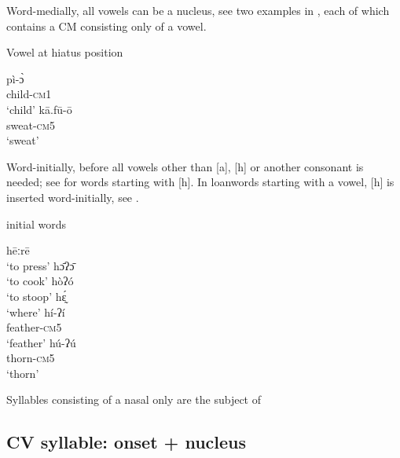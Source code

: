 \documentclass[output=paper]{langscibook}
\begin{document}
Word-medially, all vowels can be a nucleus, see two examples in , each of which contains a CM consisting only of a vowel.

 \begin{exe}
     \ex \label{ex:traore:VowelHiatusPosition:6}Vowel at hiatus position
     \begin{multicols}{2}
     \begin{xlist}
         \ex \gll pì-ɔ̀ \\
            child-\textsc{cm1}\\
        \trans `child'
        \ex \gll kā.fū-ō \\
             sweat-\textsc{cm5}\\
             \trans `sweat'
     \end{xlist}
     \end{multicols}
 \end{exe}
        

Word-initially, before all vowels other than [a], [h] or another consonant is needed; see  for words starting with [h].  In loanwords starting with a vowel, [h] is inserted word-initially, see .

 \begin{exe}
     \ex {[h]} initial words \label{ex:traore:hInitialWords:7}
     \begin{multicols}{2}
     \begin{xlist}
         \ex hēːrē\\
            `to press'
        \ex  hɔ̄ʔɔ̄  \\
            `to cook'
        \ex hòʔó \\
            `to stoop'
        \columnbreak
        \ex  hɛ̰́   \\
            `where'
        \ex \gll hí-ʔí\\
            feather-\textsc{cm5}\\
            \trans `feather'
        \ex  \gll hú-ʔú \\
            thorn-\textsc{cm5}\\
            \trans `thorn'
     \end{xlist}
     \end{multicols}
 \end{exe}

Syllables consisting of a nasal only are the subject of 

\subsection{ CV syllable: onset + nucleus}
\label{sec:traore:cvsyllable:2b}
\end{document}
